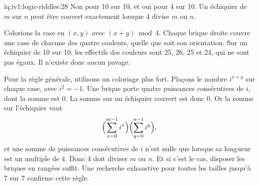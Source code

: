 \begin{solution}{iq:iv1:logic-riddles:28}
Non pour 10 sur 10, et oui pour 4 sur 10. Un échiquier de $m$ sur $n$ peut être couvert exactement lorsque 4 divise $m$ ou $n$.

Colorions la case en $(x, y)$ avec $(x + y) \bmod 4$. Chaque brique droite couvre une case de chacune des quatre couleurs, quelle que soit son orientation. Sur un échiquier de 10 sur 10, les effectifs des couleurs sont 25, 26, 25 et 24, qui ne sont pas égaux. Il n'existe donc aucun pavage.

Pour la règle générale, utilisons un coloriage plus fort. Plaçons le nombre $i^{x + y}$ sur chaque case, avec $i^2 = -1$. Une brique porte quatre puissances consécutives de $i$, dont la somme est 0. La somme sur un échiquier couvert est donc 0. Or la somme sur l'échiquier vaut
\[
\Bigl(\sum_{x = 0}^{m - 1} i^x\Bigr)\Bigl(\sum_{y = 0}^{n - 1} i^y\Bigr),
\]
et une somme de puissances consécutives de $i$ n'est nulle que lorsque sa longueur est un multiple de 4. Donc 4 doit diviser $m$ ou $n$. Et si c'est le cas, disposer les briques en rangées suffit. Une recherche exhaustive pour toutes les tailles jusqu'à 7 sur 7 confirme cette règle.

\end{solution}

